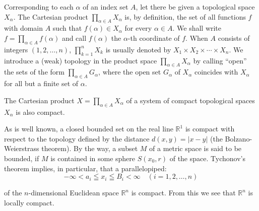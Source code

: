 
\begin{definitionu} Corresponding to each $\alpha$ of an index set $A$, let there be given a topological space $X_{\alpha}$. The Cartesian product $\prod\limits_{\alpha \in A} X_{\alpha}$ is, by definition, the set of all functions $f$ with domain $A$ such that $f(\alpha) \in X_{\alpha}$ for every $\alpha \in A$. We shall write $f = \prod\limits_{\alpha \in A} f(\alpha)$ and call $f(\alpha)$ the $\alpha$-th coordinate of $f$. When $A$ consists of integers $(1, 2, \ldots, n)$, $\prod\limits_{k=1}^{n} X_k$ is usually denoted by $X_1 \times X_2 \times \cdots \times X_n$. We introduce a (weak) topology in the product space $\prod\limits_{\alpha \in A} X_{\alpha}$ by calling ``open'' the sets of the form $\prod\limits_{\alpha \in A} G_{\alpha}$, where the open set $G_{\alpha}$ of $X_{\alpha}$ coincides with $X_{\alpha}$ for all but a finite set of $\alpha$. 
\end{definitionu}

\begin{theoremn} The Cartesian product $X = \prod\limits_{\alpha \in A} X_{\alpha}$ of a system of compact topological spaces $X_{\alpha}$ is also compact. 
\end{theoremn}

\begin{remarku} As is well known, a closed bounded set on the real line $\mathbb{R}^{1}$ is compact with respect to the topology defined by the distance $d(x,y)=|x-y|$ (the Bolzano-Weierstrass theorem). By the way, a subset $M$ of a metric space is said to be bounded, if $M$ is contained in some sphere $S(x_{0},r)$ of the space. Tychonov's theorem implies, in particular, that a parallelopiped: 
\[
- \infty < a _{i} \leqq x _{i} \leqq B_{i} < \infty \quad (i = 1, 2, \dots , n)
\]
\end{remarku}

of the $n$-dimensional Euclidean space $\mathbb{R}^{n}$ is compact. From this we see that $\mathbb{R}^{n}$ is locally compact. 

